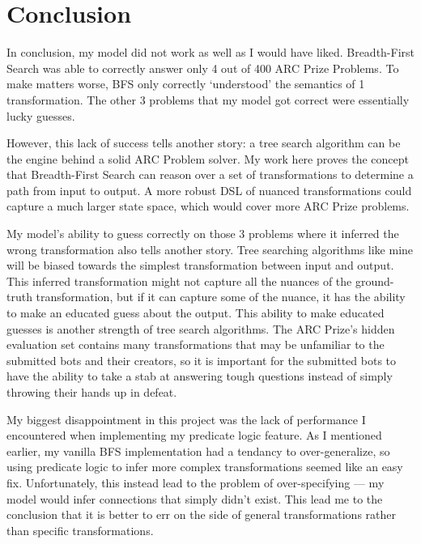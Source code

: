 \documentclass[letterpaper]{article} %
\begin{document}
\section{Conclusion}
In conclusion, my model did not work as well as I would have liked. Breadth-First Search was able to correctly answer only 4 out of 400 ARC Prize Problems. To make matters worse, BFS only correctly `understood' the semantics of 1 transformation. The other 3 problems that my model got correct were essentially lucky guesses.

\bigskip

However, this lack of success tells another story: a tree search algorithm can be the engine behind a solid ARC Problem solver. My work here proves the concept that Breadth-First Search can reason over a set of transformations to determine a path from input to output. A more robust DSL of nuanced transformations could capture a much larger state space, which would cover more ARC Prize problems.

\bigskip

My model's ability to guess correctly on those 3 problems where it inferred the wrong transformation also tells another story. Tree searching algorithms like mine will be biased towards the simplest transformation between input and output. This inferred transformation might not capture all the nuances of the ground-truth transformation, but if it can capture some of the nuance, it has the ability to make an educated guess about the output. This ability to make educated guesses is another strength of tree search algorithms. The ARC Prize's hidden evaluation set contains many transformations that may be unfamiliar to the submitted bots and their creators, so it is important for the submitted bots to have the ability to take a stab at answering tough questions instead of simply throwing their hands up in defeat.

\bigskip

My biggest disappointment in this project was the lack of performance I encountered when implementing my predicate logic feature. As I mentioned earlier, my vanilla BFS implementation had a tendancy to over-generalize, so using predicate logic to infer more complex transformations seemed like an easy fix. Unfortunately, this instead lead to the problem of over-specifying --- my model would infer connections that simply didn't exist. This lead me to the conclusion that it is better to err on the side of general transformations rather than specific transformations. 
\end{document}
